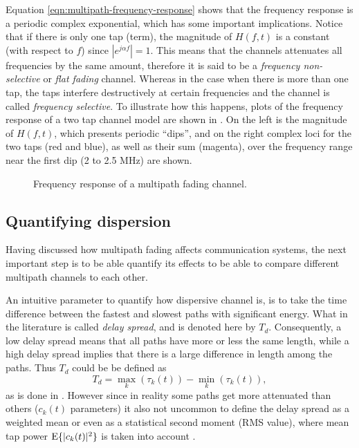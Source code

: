 Equation \eqref{eqn:multipath-frequency-response} shows that the frequency response is a periodic complex exponential, which has some important implications. Notice that if there is only one tap (term), the magnitude of \(H(f, t)\) is a constant (with respect to \(f\)) since \(|e^{j\alpha f}| = 1\). This means that the channels attenuates all frequencies by the same amount, therefore it is said to be a \emph{frequency non-selective} or \emph{flat fading} channel. Whereas in the case when there is more than one tap, the taps interfere destructively at certain frequencies and the channel is called \emph{frequency selective}. To illustrate how this happens, plots of the frequency response of a two tap channel model are shown in . On the left is the magnitude of \(H(f, t)\), which presents periodic ``dips'', and on the right complex loci for the two taps (red and blue), as well as their sum (magenta), over the frequency range near the first dip (2 to 2.5 MHz) are shown.


\begin{figure}
	\centering
	\resizebox{\linewidth}{!}{
		
	}
	\caption{
		Frequency response of a multipath fading channel.
		\label{fig:multipath-frequency-response-plots}
	}
\end{figure}

\subsection{Quantifying dispersion}

Having discussed how multipath fading affects communication systems, the next important step is to be able quantify its effects to be able to compare different multipath channels to each other.

An intuitive parameter to quantify how dispersive channel is, is to take the time difference between the fastest and slowest paths with significant energy. What in the literature is called \emph{delay spread}, and is denoted here by \(T_d\). Consequently, a low delay spread means that all paths have more or less the same length, while a high delay spread implies that there is a large difference in length among the paths. Thus \(T_d\) could be be defined as
\begin{equation}
	T_d = \max_{k} (\tau_k(t)) -  \min_{k} (\tau_k(t)),
\end{equation}
as is done in \cite{Gallager}. However since in reality some paths get more attenuated than others (\(c_k(t)\) parameters) it also not uncommon to define the delay spread as a weighted mean or even as a statistical second moment (RMS value), where mean tap power \(\operatorname{E}\{|c_k(t)|^2\}\) is taken into account \cite{Mathis,Messier}. %

